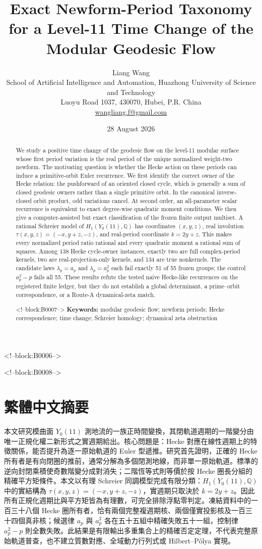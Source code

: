 \documentclass[11pt]{article}
\title{Exact Newform-Period Taxonomy for a Level-11 Time Change of the Modular Geodesic Flow}
\author{Liang Wang\\[2pt]
\small School of Artificial Intelligence and Automation, Huazhong University of Science and Technology\\
\small Luoyu Road 1037, 430070, Hubei, P.R. China\\
\small \href{mailto:wangliang.f@gmail.com}{wangliang.f@gmail.com}}
\date{28 August 2026}
\theoremstyle{definition}
\theoremstyle{remark}
\newcommand{\QQ}{\mathbb Q}
\begin{document}
\maketitle

<!--block:B0006-->
\begin{abstract}
We study a positive time change of the geodesic flow on the level-11 modular surface whose first period variation is the real period of the unique normalized weight-two newform. The motivating question is whether the Hecke action on these periods can induce a primitive-orbit Euler recurrence. We first identify the correct owner of the Hecke relation: the pushforward of an oriented closed cycle, which is generally a sum of closed geodesic owners rather than a single primitive orbit. In the canonical inverse-closed orbit product, odd variations cancel. At second order, an all-parameter scalar recurrence is equivalent to exact degree-wise quadratic moment conditions. We then give a computer-assisted but exact classification of the frozen finite output multiset. A rational Schreier model of $H_1(Y_0(11),\QQ)$ has coordinates $(x,y,z)$, real involution $\tau(x,y,z)=(-x,y+z,-z)$, and real-period coordinate $k=2y+z$. This makes every normalized period ratio rational and every quadratic moment a rational sum of squares. Among 138 Hecke cycle-owner instances, exactly two are full complex-period kernels, two are real-projection-only kernels, and 134 are true nonkernels. The candidate laws $\lambda_p=a_p$ and $\lambda_p=a_p^2$ each fail exactly 51 of 55 frozen groups; the control $a_p^2-p$ fails all 55. These results refute the tested naive Hecke-like recurrences on the registered finite ledger, but they do not establish a global determinant, a prime--orbit correspondence, or a Route-A dynamical-zeta match.

<!--block:B0007-->
\medskip
\noindent\textbf{Keywords:} modular geodesic flow; newform periods; Hecke correspondence; time change; Schreier homology; dynamical zeta obstruction
\end{abstract}

<!--block:B0008-->
\section*{繁體中文摘要}
本文研究模曲面 $Y_0(11)$ 測地流的一族正時間變換，其閉軌道週期的一階變分由唯一正規化權二新形式之實週期給出。核心問題是：Hecke 對應在線性週期上的特徵關係，能否提升為逐一原始軌道的 Euler 型遞推。研究首先證明，正確的 Hecke 所有者是有向閉圈的推前，通常分解為多個閉測地線，而非單一原始軌道。標準的逆向封閉乘積使奇數階變分成對消失；二階恆等式則等價於按 Hecke 圈長分組的精確平方矩條件。本文以有理 Schreier 同調模型完成有限分類：$H_1(Y_0(11),\QQ)$ 中的實結構為 $\tau(x,y,z)=(-x,y+z,-z)$，實週期只取決於 $k=2y+z$。因此所有正規化週期比與平方矩皆為有理數，可完全排除浮點零判定。凍結資料中的一百三十八個 Hecke 圈所有者，恰有兩個完整複週期核、兩個僅實投影核及一百三十四個真非核；候選律 $a_p$ 與 $a_p^2$ 各在五十五組中精確失敗五十一組，控制律 $a_p^2-p$ 則全數失敗。此結果是有限輸出多重集合上的精確否定定理，不代表完整原始軌道普查，也不建立質數對應、全域動力行列式或 Hilbert--Pólya 實現。
\end{document}
